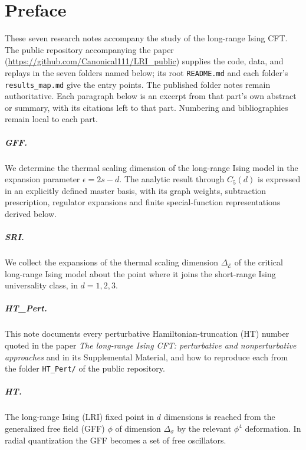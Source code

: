 \chapter*{Preface}
These seven research notes accompany the study of the long-range Ising CFT.
The public repository accompanying the paper (\url{https://github.com/Canonical111/LRI_public}) supplies the code, data, and
replays in the seven folders named below; its root \texttt{README.md} and each
folder's \texttt{results\_map.md} give the entry points. The published folder notes
remain authoritative. Each paragraph below is an excerpt from that part's
own abstract or summary, with its citations left to that part. Numbering and bibliographies remain local to each part.
\begingroup
\newcommand{\De}{\Delta_{\mathcal E}}\newcommand{\Ds}{\Delta_\sigma}
\newcommand{\eps}{\epsilon}\newcommand{\code}[1]{\texttt{#1}}

\paragraph{GFF.} We determine the thermal scaling dimension of the long-range Ising model in the expansion parameter $\epsilon=2s-d$. The analytic result through $C_5(d)$ is expressed in an explicitly defined master basis, with its graph weights, subtraction prescription, regulator expansions and finite special-function representations derived below.

\paragraph{SRI.} We collect the expansions of the thermal scaling dimension $\De$ of the critical long-range Ising model about the point where it joins the short-range Ising universality class, in $d=1,2,3$.

\paragraph{HT\_Pert.} This note documents every perturbative Hamiltonian-truncation (HT) number quoted in the paper \emph{The long-range Ising CFT: perturbative and nonperturbative approaches} and in its Supplemental Material, and how to reproduce each from the folder \code{HT\_Pert/} of the public repository.

\paragraph{HT.} The long-range Ising (LRI) fixed point in $d$ dimensions is reached from the generalized free field (GFF) $\phi$ of dimension $\Ds$ by the relevant $\phi^4$ deformation. In radial quantization the GFF becomes a set of free oscillators.

